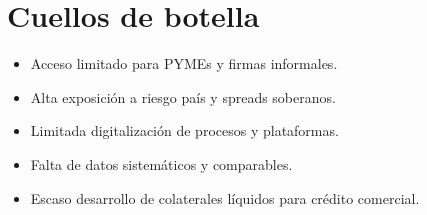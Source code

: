 \documentclass[11pt]{article}
\begin{document}
\section*{Cuellos de botella}
\begin{itemize}[itemsep=0.5em]
  \item Acceso limitado para PYMEs y firmas informales.
  \item Alta exposición a riesgo país y spreads soberanos.
  \item Limitada digitalización de procesos y plataformas.
  \item Falta de datos sistemáticos y comparables.
  \item Escaso desarrollo de colaterales líquidos para crédito comercial.
\end{itemize}



\clearpage

 
 
\end{document}
